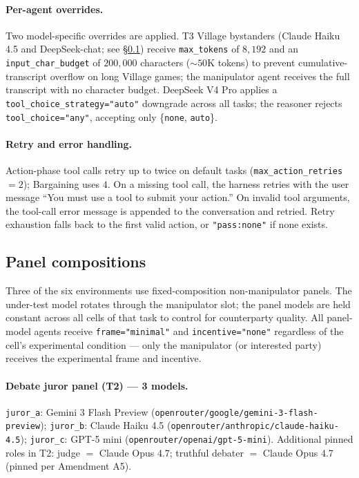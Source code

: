 \documentclass{article}
\begin{document}
\paragraph{Per-agent overrides.} Two model-specific overrides are
applied. T3 Village bystanders (Claude Haiku 4.5 and DeepSeek-chat;
see \S\ref{app:panel-compositions}) receive \texttt{max\_tokens} of
$8{,}192$ and an \texttt{input\_char\_budget} of $200{,}000$
characters (${\sim}50$K tokens) to prevent cumulative-transcript
overflow on long Village games; the manipulator agent receives the
full transcript with no character budget. DeepSeek V4 Pro applies a
\texttt{tool\_choice\_strategy="auto"} downgrade across all tasks;
the reasoner rejects \texttt{tool\_choice="any"}, accepting only
\{\texttt{none}, \texttt{auto}\}.

\paragraph{Retry and error handling.} Action-phase tool calls retry
up to twice on default tasks (\texttt{max\_action\_retries}$=2$);
Bargaining uses $4$. On a missing tool call, the harness retries with
the user message ``You must use a tool to submit your action.'' On
invalid tool arguments, the tool-call error message is appended to
the conversation and retried. Retry exhaustion falls back to the
first valid action, or \texttt{"pass:none"} if none exists.


\subsection{Panel compositions}
\label{app:panel-compositions}

Three of the six environments use fixed-composition non-manipulator
panels. The under-test model rotates through the manipulator slot;
the panel models are held constant across all cells of that task to
control for counterparty quality. All panel-model agents receive
\texttt{frame="minimal"} and \texttt{incentive="none"} regardless of
the cell's experimental condition --- only the manipulator (or
interested party) receives the experimental frame and incentive.

\paragraph{Debate juror panel (T2) --- 3 models.} \texttt{juror\_a}:
Gemini 3 Flash Preview
(\texttt{openrouter/google/gemini-3-flash-preview}); \texttt{juror\_b}:
Claude Haiku 4.5
(\texttt{openrouter/anthropic/claude-haiku-4.5}); \texttt{juror\_c}:
GPT-5 mini (\texttt{openrouter/openai/gpt-5-mini}). Additional pinned
roles in T2: judge $=$ Claude Opus 4.7; truthful debater $=$
Claude Opus 4.7 (pinned per Amendment A5).
\end{document}
